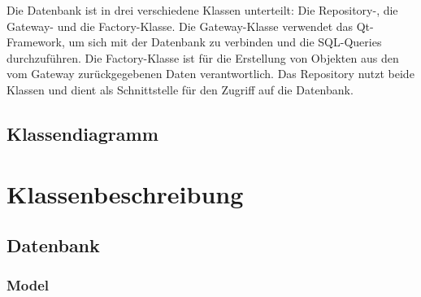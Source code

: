 \documentclass[a4paper,12pt]{article}
\begin{document}
Die Datenbank ist in drei verschiedene Klassen unterteilt: Die Repository-, die Gateway- und die Factory-Klasse. Die Gateway-Klasse verwendet das Qt-Framework, um sich mit der Datenbank zu verbinden und die SQL-Queries durchzuführen. Die Factory-Klasse ist für die Erstellung von Objekten aus den vom Gateway zurückgegebenen Daten verantwortlich. Das Repository nutzt beide Klassen und dient als Schnittstelle für den Zugriff auf die Datenbank.


\subsection{Klassendiagramm}





\clearpage
\section{Klassenbeschreibung}

\subsection{Datenbank}
\subsubsection{Model}
\end{document}
